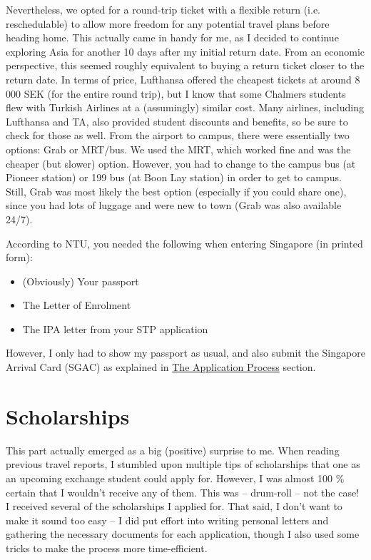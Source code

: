 Nevertheless, we opted for a round-trip ticket with a flexible return (i.e. reschedulable) to allow more freedom for any potential travel plans before heading home. This actually came in handy for me, as I decided to continue exploring Asia for another 10 days after my initial return date. From an economic perspective, this seemed roughly equivalent to buying a return ticket closer to the return date. In terms of price, Lufthansa offered the cheapest tickets at around 8\,000 SEK (for the entire round trip), but I know that some Chalmers students flew with Turkish Airlines at a (assumingly) similar cost. Many airlines, including Lufthansa and TA, also provided student discounts and benefits, so be sure to check for those as well. From the airport to campus, there were essentially two options: Grab or MRT/bus. We used the MRT, which worked fine and was the cheaper (but slower) option. However, you had to change to the campus bus (at Pioneer station) or 199 bus (at Boon Lay station) in order to get to campus. Still, Grab was most likely the best option (especially if you could share one), since you had lots of luggage and were new to town (Grab was also available 24/7).

\vspace{-0.3cm}
\hrulefill

According to NTU, you needed the following when entering Singapore (in printed form):
\begin{itemize}
    \item (Obviously) Your passport
    \item The Letter of Enrolment
    \item The IPA letter from your STP application
\end{itemize}
However, I only had to show my passport as usual, and also submit the Singapore Arrival Card (SGAC) as explained in \hyperref[app]{The Application Process} section.
\vspace{-0.1cm}
\section*{Scholarships}
{}
This part actually emerged as a big (positive) surprise to me. When reading previous travel reports, I stumbled upon multiple tips of scholarships that one as an upcoming exchange student could apply for. However, I was almost 100 \% certain that I wouldn't receive any of them. This was -- drum-roll -- not the case! I received several of the scholarships I applied for. That said, I don't want to make it sound too easy -- I did put effort into writing personal letters and gathering the necessary documents for each application, though I also used some tricks to make the process more time-efficient.

